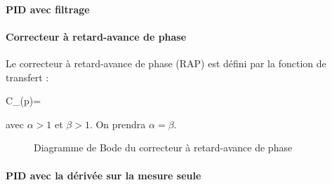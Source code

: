 \paragraph{PID avec filtrage}
\paragraph{Correcteur à retard-avance de phase}
Le correcteur à retard-avance de phase (RAP) est défini par la fonction 
de transfert :
\begin{bequation}
    C_{}(p)=\cdot
\end{bequation}
avec $\alpha>1$ et $\beta>1$. On prendra $\alpha=\beta$.
\begin{figure}
    \centering
    
    
    
    \caption{Diagramme de Bode du correcteur à retard-avance de phase}
\end{figure}
\paragraph{PID avec la dérivée sur la mesure seule}

\clearpage
